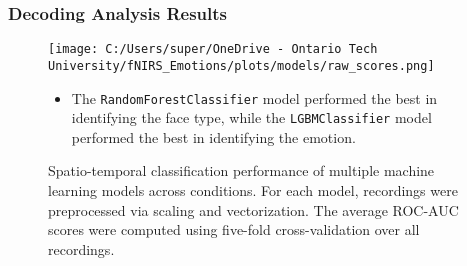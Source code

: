 \documentclass{beamer}
\begin{document}
\begin{frame}
    \frametitle{Decoding Analysis Results}
    \begin{figure}
        \texttt{[image: C:/Users/super/OneDrive - Ontario Tech University/fNIRS\_Emotions/plots/models/raw\_scores.png]}
        \caption{Spatio-temporal classification performance of multiple machine learning models across conditions. For each model, recordings were preprocessed via scaling and vectorization. The average ROC-AUC scores were computed using five-fold cross-validation over all recordings. }
        \begin{itemize}
            \item The \texttt{RandomForestClassifier} model performed the best in identifying the face type, while the \texttt{LGBMClassifier} model performed the best in identifying the emotion.
        \end{itemize}
    \end{figure}
\end{frame}
\end{document}
